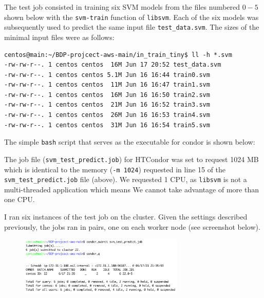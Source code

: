 \documentclass{article}
\begin{document}
The test job consisted in training six SVM models from the files numbered $0 - 5$ shown below with the \texttt{svm-train} function of \texttt{libsvm}.
Each of the six models was subsequently used to predict the same input file \texttt{test\_data.svm}.
The sizes of the minimal input files were as follows: 
\begin{lstlisting} 
centos@main:~/BDP-projcect-aws-main/in_train_tiny$ ll -h *.svm
-rw-rw-r--. 1 centos centos  16M Jun 17 20:52 test_data.svm
-rw-rw-r--. 1 centos centos 5.1M Jun 16 16:44 train0.svm
-rw-rw-r--. 1 centos centos  11M Jun 16 16:47 train1.svm
-rw-rw-r--. 1 centos centos  16M Jun 16 16:50 train2.svm
-rw-rw-r--. 1 centos centos  21M Jun 16 16:52 train3.svm
-rw-rw-r--. 1 centos centos  26M Jun 16 16:53 train4.svm
-rw-rw-r--. 1 centos centos  31M Jun 16 16:54 train5.svm
\end{lstlisting}
The simple \texttt{bash} script that serves as the executable for condor is shown below:

The job file (\texttt{svm\_test\_predict.job}) for HTCondor was set to request 1024 MB which is identical to the memory (\texttt{-m 1024}) requested in line 15 of the \texttt{svm\_test\_predict.job} file (above). We requested 1 CPU, as \texttt{libsvm} is not a multi-threaded application which means We cannot take advantage of more than one CPU.


I ran six instances of the test job on the cluster. Given the settings described previously, the jobs ran in pairs, one on each worker node (see screenshot below).

\begin{figure}[!h]
    \includegraphics[width=0.7\textwidth]{./img/condor_submit_q}
\end{figure}
\FloatBarrier%
\end{document}

